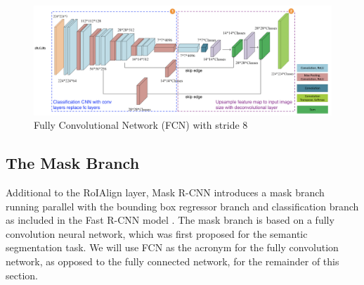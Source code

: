 \begin{figure}[!ht]
    \centering
    \includegraphics[width=5in]{figures/fcn_archite.png}
    \caption{Fully Convolutional Network (FCN) with stride 8 \cite{fcn_archite_2018}} 
    \label{fig:fcn_archite}
\end{figure}

\subsection{The Mask Branch}

Additional to the RoIAlign layer, Mask R-CNN introduces a mask branch running parallel with the bounding box regressor branch and classification branch as included in the Fast R-CNN model \cite{mask_rcnn_2017}. The mask branch is based on a fully convolution neural network, which was first proposed for the semantic segmentation task. We will use FCN as the acronym for the fully convolution network, as opposed to the fully connected network, for the remainder of this section. 

